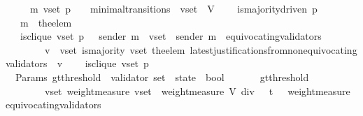 \begin{isabellebody}
\ \ {\isachardoublequoteopen}{\isasymforall}\ {\isasymsigma}\ {\isasymsigma}{\isacharprime}\ m{\isacharprime}\ v{\isacharunderscore}set\ p{\isachardot}\ {\isacharparenleft}{\isasymsigma}{\isacharcomma}\ {\isasymsigma}{\isacharprime}{\isacharparenright}\ {\isasymin}\ minimal{\isacharunderscore}transitions\ {\isasymand}\ v{\isacharunderscore}set\ {\isasymsubseteq}\ V\ \isanewline
\ \ {\isasymlongrightarrow}\ is{\isacharunderscore}majority{\isacharunderscore}driven\ p\isanewline
\ \ {\isasymlongrightarrow}\ m{\isacharprime}\ {\isacharequal}\ the{\isacharunderscore}elem\ {\isacharparenleft}{\isasymsigma}{\isacharprime}\ {\isacharminus}\ {\isasymsigma}{\isacharparenright}\isanewline
\ \ {\isasymlongrightarrow}\ is{\isacharunderscore}clique\ {\isacharparenleft}v{\isacharunderscore}set{\isacharcomma}\ p{\isacharcomma}\ {\isasymsigma}{\isacharparenright}\ {\isasymand}\ sender\ m{\isacharprime}\ {\isasymin}\ v{\isacharunderscore}set\ {\isasymand}\ sender\ m{\isacharprime}\ {\isasymnotin}\ equivocating{\isacharunderscore}validators\ {\isasymsigma}{\isacharprime}\isanewline
\ \ \ \ \ \ {\isasymand}\ {\isacharparenleft}{\isasymforall}\ v\ {\isasymin}\ v{\isacharunderscore}set{\isachardot}\ is{\isacharunderscore}majority\ {\isacharparenleft}v{\isacharunderscore}set{\isacharcomma}\ the{\isacharunderscore}elem\ {\isacharparenleft}latest{\isacharunderscore}justifications{\isacharunderscore}from{\isacharunderscore}non{\isacharunderscore}equivocating{\isacharunderscore}validators\ {\isasymsigma}\ v{\isacharparenright}{\isacharparenright}{\isacharparenright}\ \isanewline
\ \ {\isasymlongrightarrow}\ is{\isacharunderscore}clique\ {\isacharparenleft}v{\isacharunderscore}set{\isacharcomma}\ p{\isacharcomma}\ {\isasymsigma}{\isacharprime}{\isacharparenright}{\isachardoublequoteclose}\isanewline
%
\isadelimproof
\ \ %
\endisadelimproof
%
\isatagproof
{}\isamarkupfalse%
%
\endisatagproof
{\isafoldproof}%
%
\isadelimproof
\isanewline
%
\endisadelimproof
\isanewline
\isanewline
\isanewline
\isanewline
\ \isanewline
{}\isamarkupfalse%
\ {\isacharparenleft}\ Params{\isacharparenright}\ gt{\isacharunderscore}threshold\ {\isacharcolon}{\isacharcolon}\ {\isachardoublequoteopen}{\isacharparenleft}validator\ set\ {\isacharasterisk}\ state{\isacharparenright}\ {\isasymRightarrow}\ bool{\isachardoublequoteclose}\isanewline
\ \ \isanewline
\ \ \ \ {\isachardoublequoteopen}gt{\isacharunderscore}threshold\ \isanewline
\ \ \ \ \ \ \ {\isacharequal}\ {\isacharparenleft}{\isasymlambda}{\isacharparenleft}v{\isacharunderscore}set{\isacharcomma}\ {\isasymsigma}{\isacharparenright}{\isachardot}{\isacharparenleft}weight{\isacharunderscore}measure\ v{\isacharunderscore}set\ {\isachargreater}\ {\isacharparenleft}weight{\isacharunderscore}measure\ V{\isacharparenright}\ div\ {}\ {\isacharplus}\ t\ \ {\isacharminus}\ weight{\isacharunderscore}measure\ {\isacharparenleft}equivocating{\isacharunderscore}validators\ {\isasymsigma}{\isacharparenright}{\isacharparenright}{\isacharparenright}{\isachardoublequoteclose}\isanewline

\end{isabellebody}

